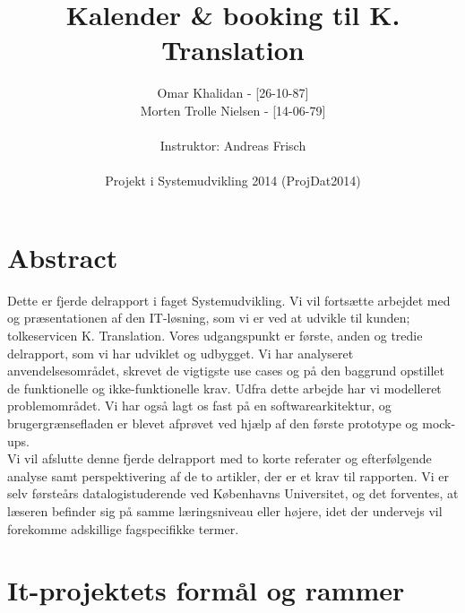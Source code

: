 \documentclass[12pt]{article}   %
\title{Kalender \& booking til K. Translation}
\author{Omar Khalidan - [26-10-87]\\
     Morten Trolle Nielsen - [14-06-79]\\ \\
    Instruktor: Andreas Frisch\\ \\
Projekt i Systemudvikling 2014 (ProjDat2014)}
\begin{document}
\maketitle
\thispagestyle{empty}
\newpage
\tableofcontents
\newpage

\section{Abstract}
Dette er fjerde delrapport i faget Systemudvikling. Vi vil fortsætte arbejdet med og præsentationen af den IT-løsning, som vi er ved at udvikle til kunden; tolkeservicen K. Translation. Vores udgangspunkt er første, anden og tredie delrapport, som vi har udviklet og udbygget. Vi har analyseret anvendelsesområdet, skrevet de vigtigste use cases og på den baggrund opstillet de funktionelle og ikke-funktionelle krav. Udfra dette arbejde har vi modelleret problemområdet. Vi har også lagt os fast på en softwarearkitektur, og brugergrænsefladen er blevet afprøvet ved hjælp af den første prototype og mock-ups.  \\
Vi vil afslutte denne fjerde delrapport med to korte referater og efterfølgende analyse samt perspektivering af de to artikler, der er et krav til rapporten. Vi er selv førsteårs datalogistuderende ved Københavns Universitet, og det forventes, at læseren befinder sig på samme læringsniveau eller højere, idet der undervejs vil forekomme adskillige fagspecifikke termer. 

\newpage

\section{It-projektets formål og rammer}
\end{document}
